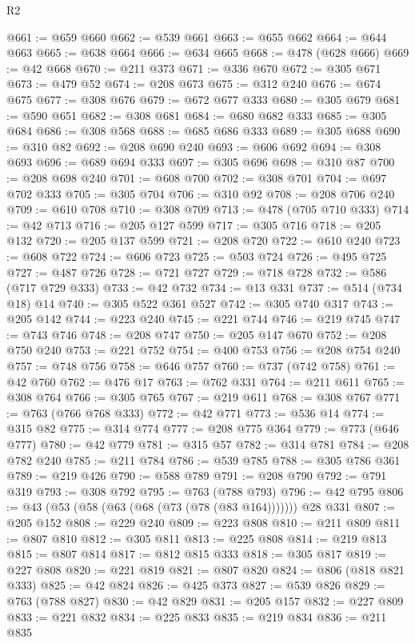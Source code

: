 \begin{lexlean}{R2}
\begin{coremodule}
@661 := @659 @660
@662 := @539 @661
@663 := @655 @662
@664 := @644 @663
@665 := @638 @664
@666 := @634 @665
@668 := @478 (@628 @666)
@669 := @42 @668
@670 := @211 @373
@671 := @336 @670
@672 := @305 @671
@673 := @479 @52
@674 := @208 @673
@675 := @312 @240
@676 := @674 @675
@677 := @308 @676
@679 := @672 @677 @333
@680 := @305 @679
@681 := @590 @651
@682 := @308 @681
@684 := @680 @682 @333
@685 := @305 @684
@686 := @308 @568
@688 := @685 @686 @333
@689 := @305 @688
@690 := @310 @82
@692 := @208 @690 @240
@693 := @606 @692
@694 := @308 @693
@696 := @689 @694 @333
@697 := @305 @696
@698 := @310 @87
@700 := @208 @698 @240
@701 := @608 @700
@702 := @308 @701
@704 := @697 @702 @333
@705 := @305 @704
@706 := @310 @92
@708 := @208 @706 @240
@709 := @610 @708
@710 := @308 @709
@713 := @478 (@705 @710 @333)
@714 := @42 @713
@716 := @205 @127 @599
@717 := @305 @716
@718 := @205 @132
@720 := @205 @137 @599
@721 := @208 @720
@722 := @610 @240
@723 := @608 @722
@724 := @606 @723
@725 := @503 @724
@726 := @495 @725
@727 := @487 @726
@728 := @721 @727
@729 := @718 @728
@732 := @586 (@717 @729 @333)
@733 := @42 @732
@734 := @13 @331
@737 := @514 (@734 @18) @14
@740 := @305 @522 @361 @527
@742 := @305 @740 @317
@743 := @205 @142
@744 := @223 @240
@745 := @221 @744
@746 := @219 @745
@747 := @743 @746
@748 := @208 @747
@750 := @205 @147 @670
@752 := @208 @750 @240
@753 := @221 @752
@754 := @400 @753
@756 := @208 @754 @240
@757 := @748 @756
@758 := @646 @757
@760 := @737 (@742 @758)
@761 := @42 @760
@762 := @476 @17
@763 := @762 @331
@764 := @211 @611
@765 := @308 @764
@766 := @305 @765
@767 := @219 @611
@768 := @308 @767
@771 := @763 (@766 @768 @333)
@772 := @42 @771
@773 := @536 @14
@774 := @315 @82
@775 := @314 @774
@777 := @208 @775 @364
@779 := @773 (@646 @777)
@780 := @42 @779
@781 := @315 @57
@782 := @314 @781
@784 := @208 @782 @240
@785 := @211 @784
@786 := @539 @785
@788 := @305 @786 @361
@789 := @219 @426
@790 := @588 @789
@791 := @208 @790
@792 := @791 @319
@793 := @308 @792
@795 := @763 (@788 @793)
@796 := @42 @795
@806 := @43 (@53 (@58 (@63 (@68 (@73 (@78 (@83 @164))))))) @28 @331
@807 := @205 @152
@808 := @229 @240
@809 := @223 @808
@810 := @211 @809
@811 := @807 @810
@812 := @305 @811
@813 := @225 @808
@814 := @219 @813
@815 := @807 @814
@817 := @812 @815 @333
@818 := @305 @817
@819 := @227 @808
@820 := @221 @819
@821 := @807 @820
@824 := @806 (@818 @821 @333)
@825 := @42 @824
@826 := @425 @373
@827 := @539 @826
@829 := @763 (@788 @827)
@830 := @42 @829
@831 := @205 @157
@832 := @227 @809
@833 := @221 @832
@834 := @225 @833
@835 := @219 @834
@836 := @211 @835

\end{coremodule}
\end{lexlean}
